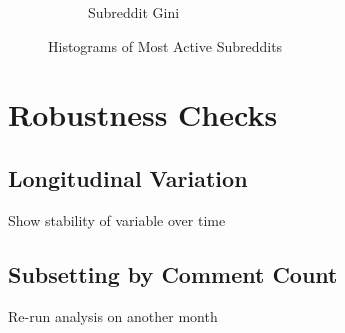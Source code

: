 \documentclass{article}
\begin{document}
\begin{figure}
\begin{subfigure}[b]{0.49\textwidth}
         \caption{Subreddit Gini}
         \label{hist:gini}
     \end{subfigure}
        \caption{Histograms of Most Active Subreddits}
        \label{hists}
\end{figure}



\section{Robustness Checks}

\subsection{Longitudinal Variation}

Show stability of variable over time

\subsection{Subsetting by Comment Count}

Re-run analysis on another month
\end{document}
